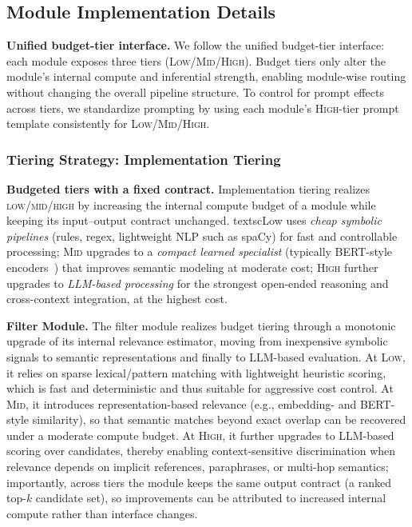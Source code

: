 \subsection{Module Implementation Details}
\label{appendix:module}

\textbf{Unified budget-tier interface.}
We follow the unified budget-tier interface: each module exposes three tiers (\textsc{Low}/\textsc{Mid}/\textsc{High}). Budget tiers only alter the module's internal compute and inferential strength, enabling module-wise routing without changing the overall pipeline structure. To control for prompt effects across tiers, we standardize prompting by using each module's \textsc{High}-tier prompt template consistently for \textsc{Low}/\textsc{Mid}/\textsc{High}.

\subsubsection{Tiering Strategy: Implementation Tiering}

\textbf{Budgeted tiers with a fixed contract.}
Implementation tiering realizes \textsc{low}/\textsc{mid}/\textsc{high} by increasing the internal compute budget of a module while keeping its input--output contract unchanged. textsc{Low} uses \emph{cheap symbolic pipelines} (rules, regex, lightweight NLP such as spaCy) for fast and controllable processing; \textsc{Mid} upgrades to a \emph{compact learned specialist} (typically BERT-style encoders~\citep{devlin2019bert}) that improves semantic modeling at moderate cost; \textsc{High} further upgrades to \emph{LLM-based processing} for the strongest open-ended reasoning and cross-context integration, at the highest cost.

\textbf{Filter Module.}
The filter module realizes budget tiering through a monotonic upgrade of its internal relevance estimator, moving from inexpensive symbolic signals to semantic representations and finally to LLM-based evaluation. At \textsc{Low}, it relies on sparse lexical/pattern matching with lightweight heuristic scoring, which is fast and deterministic and thus suitable for aggressive cost control. At \textsc{Mid}, it introduces representation-based relevance (e.g., embedding- and BERT-style similarity), so that semantic matches beyond exact overlap can be recovered under a moderate compute budget. At \textsc{High}, it further upgrades to LLM-based scoring over candidates, thereby enabling context-sensitive discrimination when relevance depends on implicit references, paraphrases, or multi-hop semantics; importantly, across tiers the module keeps the same output contract (a ranked top-$k$ candidate set), so improvements can be attributed to increased internal compute rather than interface changes.

